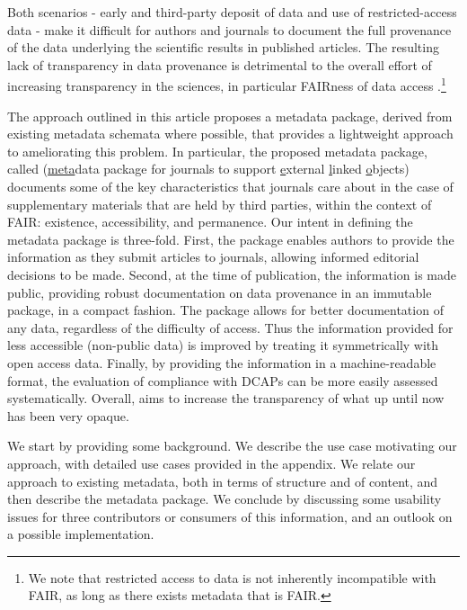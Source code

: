 Both scenarios - early and third-party deposit of data and use of restricted-access data - make it difficult for authors and journals to document the full provenance of the data underlying the scientific results in published articles. The resulting lack of transparency in data provenance is detrimental to the overall effort of increasing transparency in the sciences, in particular FAIRness of data access \citep{HagstromFORCE112014}.\footnote{We note that restricted access to data is not inherently incompatible with FAIR, as long as there exists metadata that is FAIR.}

The approach outlined in this article proposes a metadata package, derived from existing metadata schemata where possible, that provides a lightweight approach to ameliorating this problem. In particular, the proposed metadata package, called \metajelo (\underline{meta}data package for \underline{j}ournals to support \underline{e}xternal \underline{l}inked \underline{o}bjects) documents some of the key characteristics that journals care about in the case of supplementary materials that are held by third parties, within the context of FAIR: existence, accessibility, and permanence. Our intent in defining the metadata package is three-fold. First, the package enables  authors to provide the information as they submit articles to journals, allowing informed editorial decisions to be made. Second, at the time of publication, the information is made public, providing robust documentation on data provenance in an immutable package, in a compact fashion.  The package allows for better documentation of any data, regardless of the difficulty of access.   Thus the information provided for less accessible (non-public data) is improved by treating it symmetrically with open access data. Finally, by providing the information in a machine-readable format, the evaluation of compliance with \acp{DCAP} can be more easily assessed systematically. Overall, \metajelo aims to   increase the transparency of what up until now has been very opaque.

We start by providing some background. We describe the use case motivating our approach, with detailed use cases provided in the appendix. We relate our approach to existing metadata, both in terms of structure and of content, and then describe the metadata package. We conclude by discussing some usability issues for three contributors or consumers of this information, and an outlook on a possible implementation.
